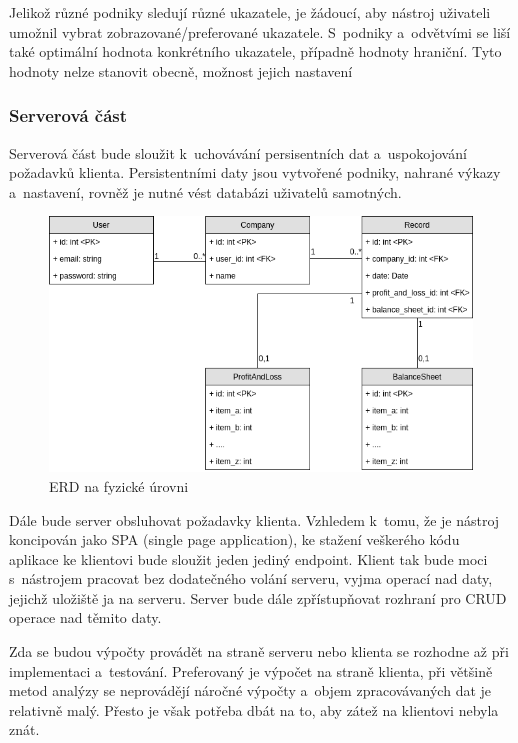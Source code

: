 Jelikož různé podniky sledují různé ukazatele, je žádoucí, aby nástroj uživateli umožnil vybrat zobrazované/preferované ukazatele. S~podniky a~odvětvími se liší také optimální hodnota konkrétního ukazatele, případně hodnoty hraniční. Tyto hodnoty nelze stanovit obecně, možnost jejich nastavení

\subsubsection{Serverová část}
Serverová část bude sloužit k~uchovávání persisentních dat a~uspokojování požadavků klienta. Persistentními daty jsou vytvořené podniky, nahrané výkazy a~nastavení, rovněž je nutné vést databázi uživatelů samotných.


\begin{figure}
  \centering
  \includegraphics[width=14cm]{img/erd.png}
  \caption{ERD na fyzické úrovni}
\end{figure}

Dále bude server obsluhovat požadavky klienta. Vzhledem k~tomu, že je nástroj koncipován jako SPA (single page application), ke stažení veškerého kódu aplikace ke klientovi bude sloužit jeden jediný endpoint. Klient tak bude moci s~nástrojem pracovat bez dodatečného volání serveru, vyjma operací nad daty, jejichž uložiště ja na serveru. Server bude dále zpřístupňovat rozhraní pro CRUD operace nad těmito daty.

Zda se budou výpočty provádět na straně serveru nebo klienta se rozhodne až při implementaci a~testování. Preferovaný je výpočet na straně klienta, při většině metod analýzy se neprovádějí náročné výpočty a~objem zpracovávaných dat je relativně malý. Přesto je však potřeba dbát na to, aby zátež na klientovi nebyla znát. 



